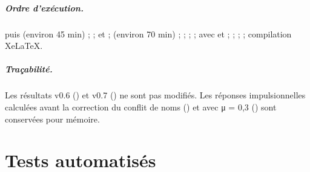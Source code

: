 \paragraph{Ordre d'exécution.}  puis  (environ
45 min) ;  ;  et  ;  (environ 70 min) ;  ;  ;
 ;  avec  et  ;
 ;  ;  ; compilation XeLaTeX.

\paragraph{Traçabilité.} Les résultats v0.6 () et v0.7 () ne sont
pas modifiés. Les réponses impulsionnelles calculées avant la correction du conflit de noms () et avec
μ = 0,3 () sont conservées pour mémoire.

\chapter{Tests automatisés}\label{ann:tests}


